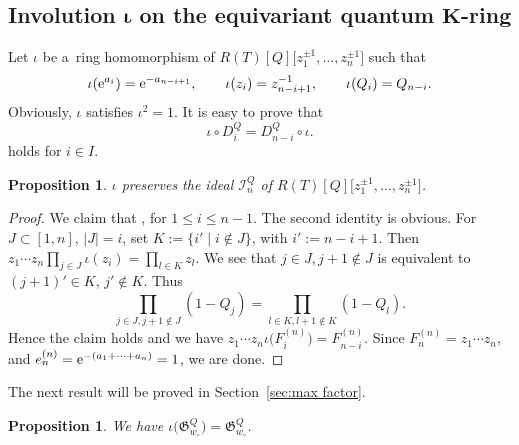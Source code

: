 \documentclass[10pt,a4paper]{amsart}
\numberwithin{equation}{section}
\newcommand{\Rep}{{R(T)}}
\newtheorem{Proposition}[Theorem]{Proposition}
\theoremstyle{definition}
\begin{document}
\subsection[Involution iota on the equivariant quantum K-ring]{Involution $\boldsymbol{\iota}$ on the equivariant quantum $\boldsymbol{K}$-ring}

Let $\iota$ be a~ring homomorphism of
$\Rep[Q]\big[z_1^{\pm 1},\dots,z_n^{\pm 1}\big]$
such that
\[
\iota({\rm e}^{a_i})={\rm e}^{-a_{n-i+1}},\qquad
\iota(z_{i})=z_{n-i+1}^{-1},\qquad
\iota(Q_i)=Q_{n-i}.
\]
Obviously,
$\iota$ satisfies $\iota^2=1$.
It is easy to prove that
\begin{equation}\label{eq:S_and_D_i}
 \iota\circ D_i^Q=D_{n-i}^Q\circ \iota.
 \end{equation}
 holds for $i\in I$.
\begin{Proposition}
$\iota$ preserves the ideal $\mathscr{I}_n^Q$ of $\Rep[Q]\big[z_1^{\pm 1},\dots,z_n^{\pm 1}\big]$.
\end{Proposition}
\begin{proof}
We claim that
, 
for $1\le i\le n-1$.
The second identity is obvious.
For $J\subset [1,n]$, $ |J|=i$, set
$K:=\{i'\mid i\notin J\}$, with $i':=n-i+1$. Then
$z_1\cdots z_n \prod_{j\in J}\iota(z_i)=\prod_{l\in K}z_l$.
We see that $j\in J, j+1\notin J$
is equivalent to
$(j+1)'\in K$, $j'\notin K$.
Thus
\[
\prod_{j\in J, j+1\notin J}
(1-Q_j)=
\prod_{l\in K, l+1\notin K}
(1-Q_l).
\]
Hence the claim holds and we have $z_1\cdots z_n \iota\bigl(F_i^{(n)}\bigr)=F_{n-i}^{(n)}$.
Since $F_n^{(n)}=z_1\cdots z_n$, and $e_n^{(n)}={\rm e}^{-(a_1+\cdots+a_n)}=1$, we are done.
\end{proof}

The next result will be proved in Section~\ref{sec:max factor}.
\begin{Proposition}\label{prop:long_iota_invariant}
We have $\iota\bigl(\mathfrak{G}_{w_\circ}^{Q}\bigr)=\mathfrak{G}_{w_\circ}^{Q}$.
\end{Proposition}
\end{document}
